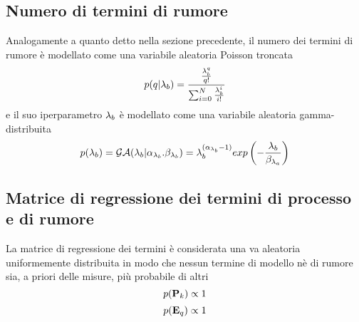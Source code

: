  \subsection*{Numero di termini di rumore}
 Analogamente a quanto detto nella sezione precedente, il numero dei termini di
rumore è modellato come una variabile aleatoria Poisson troncata
\begin{equation}
p(q|\lambda_b)=\frac{\frac{\lambda_b^q}{q!}}{\sum_{i=0}^N\frac{\lambda_b^i}{i!}}
\end{equation}
e il suo iperparametro $\lambda_b$ è modellato come una variabile aleatoria gamma-distribuita
\begin{equation}
p(\lambda_b)=\mathcal{G}\mathcal{A}(\lambda_b|\alpha_{\lambda_b}.\beta_{\lambda_b})=\lambda_b^{(\alpha_{\lambda_b}-1)}exp\left(-\frac{\lambda_b}{\beta_{\lambda_a}}\right)
\end{equation}
\subsection*{Matrice di regressione dei termini di processo e di
rumore}
La matrice di regressione dei termini è considerata una va aleatoria uniformemente
distribuita in modo che nessun termine di modello nè di rumore sia, a priori delle
misure, più probabile di altri
\begin{equation}
p(\textbf{P}_k)\propto 1
\end{equation}
\begin{equation}
p(\textbf{E}_q )\propto 1
\end{equation}
